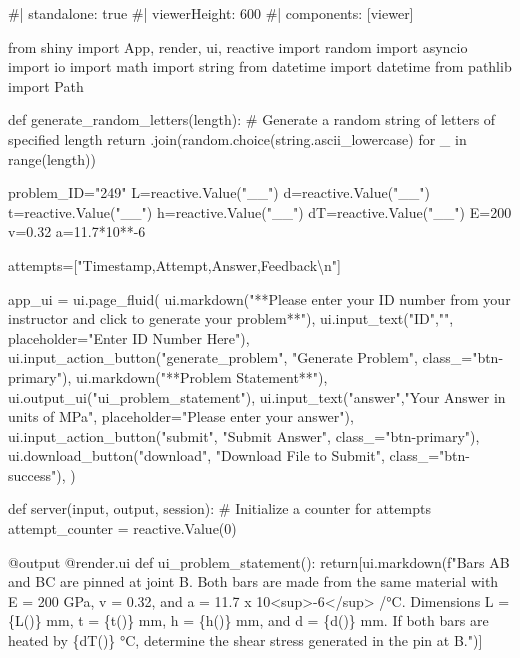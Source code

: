\documentclass[
  letterpaper,
  DIV=11,
  numbers=noendperiod]{scrreprt}
\newenvironment{Shaded}{\begin{snugshade}}{\end{snugshade}}
\newcommand{\NormalTok}[1]{\textcolor[rgb]{0.00,0.23,0.31}{#1}}
\begin{document}
\begin{Shaded}
\begin{Highlighting}[]
\NormalTok{\#| standalone: true}
\NormalTok{\#| viewerHeight: 600}
\NormalTok{\#| components: [viewer]}

\NormalTok{from shiny import App, render, ui, reactive}
\NormalTok{import random}
\NormalTok{import asyncio}
\NormalTok{import io}
\NormalTok{import math}
\NormalTok{import string}
\NormalTok{from datetime import datetime}
\NormalTok{from pathlib import Path}

\NormalTok{def generate\_random\_letters(length):}
\NormalTok{    \# Generate a random string of letters of specified length}
\NormalTok{    return \textquotesingle{}\textquotesingle{}.join(random.choice(string.ascii\_lowercase) for \_ in range(length)) }

\NormalTok{problem\_ID="249"}
\NormalTok{L=reactive.Value("\_\_")}
\NormalTok{d=reactive.Value("\_\_")}
\NormalTok{t=reactive.Value("\_\_")}
\NormalTok{h=reactive.Value("\_\_")}
\NormalTok{dT=reactive.Value("\_\_")}
\NormalTok{E=200}
\NormalTok{v=0.32}
\NormalTok{a=11.7*10**{-}6}

\NormalTok{attempts=["Timestamp,Attempt,Answer,Feedback\textbackslash{}n"]}

\NormalTok{app\_ui = ui.page\_fluid(}
\NormalTok{    ui.markdown("**Please enter your ID number from your instructor and click to generate your problem**"),}
\NormalTok{    ui.input\_text("ID","", placeholder="Enter ID Number Here"),}
\NormalTok{    ui.input\_action\_button("generate\_problem", "Generate Problem", class\_="btn{-}primary"),}
\NormalTok{    ui.markdown("**Problem Statement**"),}
\NormalTok{    ui.output\_ui("ui\_problem\_statement"),}
\NormalTok{    ui.input\_text("answer","Your Answer in units of MPa", placeholder="Please enter your answer"),}
\NormalTok{    ui.input\_action\_button("submit", "Submit Answer", class\_="btn{-}primary"),}
\NormalTok{    ui.download\_button("download", "Download File to Submit", class\_="btn{-}success"),}
\NormalTok{)}


\NormalTok{def server(input, output, session):}
\NormalTok{    \# Initialize a counter for attempts}
\NormalTok{    attempt\_counter = reactive.Value(0)}

\NormalTok{    @output}
\NormalTok{    @render.ui}
\NormalTok{    def ui\_problem\_statement():}
\NormalTok{        return[ui.markdown(f"Bars AB and BC are pinned at joint B. Both bars are made from the same material with E = 200 GPa, v = 0.32, and a = 11.7 x 10\textless{}sup\textgreater{}{-}6\textless{}/sup\textgreater{} /°C. Dimensions L = \{L()\}  mm, t = \{t()\} mm, h = \{h()\} mm, and d = \{d()\} mm. If both bars are heated by \{dT()\} °C, determine the shear stress generated in the pin at B.")]}
    

\end{Highlighting}
\end{Shaded}
\end{document}
